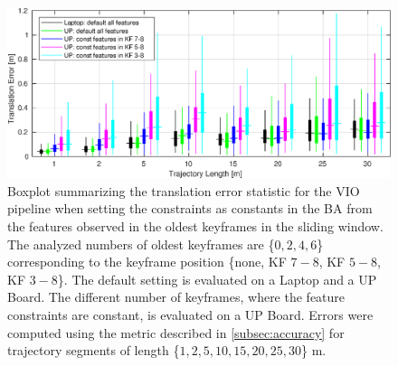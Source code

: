 \begin{figure}[H]
\centering
\includegraphics[width=1\textwidth]{images/acc_const}
\caption{Boxplot summarizing the translation error statistic for the \ac{VIO}
pipeline when setting the constraints as constants in the \ac{BA} from the 
features observed in the oldest keyframes in the sliding window. The 
analyzed numbers of oldest keyframes are \{$0, 2, 4, 6$\} corresponding to the 
keyframe position \{none, KF $7\!-\!8$, KF $5\!-\!8$, KF $3\!-\!8$\}. The 
default setting is evaluated on a Laptop and a UP Board. The different number 
of keyframes, where the feature constraints are constant, is evaluated on a UP 
Board. Errors were 
computed using the metric described in \autoref{subsec:accuracy} for trajectory 
segments of length \{$1, 2, 5, 10, 15, 20, 25, 30$\} m.}
\label{fig:acc_const}
\end{figure}


